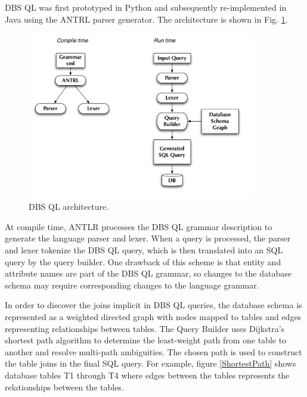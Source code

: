 \documentclass[a4paper]{jpconf}
\begin{document}
DBS QL was first prototyped in Python and subsequently re-implemented
in Java using the ANTRL parser generator. The architecture is shown in Fig. \ref{DBS_QL}.
\begin{figure}[htb]
\centering
\includegraphics[width=100mm]{DBS_QL_architecture.pdf}
\caption{DBS QL architecture.}
\label{DBS_QL}
\end{figure}
At compile time, ANTLR\cite{ANTLR} processes the DBS QL grammar description to generate
the language parser and lexer.  When a query is processed, the parser and lexer tokenize
the DBS QL query, which is then translated into an SQL query by the query builder.
One drawback of this scheme is that entity and attribute names are part of the DBS QL
grammar, so changes to the database schema may require corresponding changes to the
language grammar.

 
In order to discover the joins implicit in DBS QL queries,
the database schema is represented as a weighted
directed graph with nodes mapped to tables and edges 
representing relationships between tables\cite{GraphTool}.
The Query Builder
uses Dijkstra’s shortest path algorithm to determine the least-weight 
path from one table to another and resolve multi-path ambiguities.
The chosen path is used to construct the table joins in the final SQL query. 
For example, figure \ref{ShortestPath} shows database tables 
T1 through T4 where edges between the tables represents the 
relationships between the tables.
\end{document}
